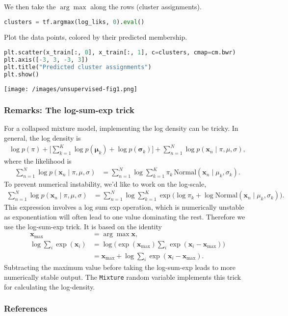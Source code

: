 We then take the $\arg\max$ along the rows (cluster assignments).
\begin{lstlisting}[language=Python]
clusters = tf.argmax(log_liks, 0).eval()
\end{lstlisting}

Plot the data points, colored by their predicted membership.
\begin{lstlisting}[language=Python]
plt.scatter(x_train[:, 0], x_train[:, 1], c=clusters, cmap=cm.bwr)
plt.axis([-3, 3, -3, 3])
plt.title("Predicted cluster assignments")
plt.show()
\end{lstlisting}

\texttt{[image: /images/unsupervised-fig1.png]}

\subsubsection{Remarks: The log-sum-exp trick}

For a collapsed mixture model, implementing the log density can be tricky.
In general, the log density is
\begin{align*}
  \log p(\pi) +
  \Big[ \sum_{k=1}^K \log p(\mathbf{\mu}_k) + \log
  p(\mathbf{\sigma}_k) \Big] +
  \sum_{n=1}^N \log p(\mathbf{x}_n \mid \pi, \mu, \sigma),
\end{align*}
where the likelihood is
\begin{align*}
  \sum_{n=1}^N \log p(\mathbf{x}_n \mid \pi, \mu, \sigma)
  &=
  \sum_{n=1}^N \log \sum_{k=1}^K \pi_k \, \text{Normal}(\mathbf{x}_n \mid
  \mu_k, \sigma_k).
\end{align*}
To prevent numerical instability, we'd like to work on the log-scale,
\begin{align*}
  \sum_{n=1}^N \log p(\mathbf{x}_n \mid \pi, \mu, \sigma)
  &=
  \sum_{n=1}^N \log \sum_{k=1}^K \exp\Big(
  \log \pi_k + \log \text{Normal}(\mathbf{x}_n \mid \mu_k, \sigma_k)\Big).
\end{align*}
This expression involves a log sum exp operation, which is
numerically unstable as exponentiation will often lead to one value
dominating the rest. Therefore we use the log-sum-exp trick.
It is based on the identity
\begin{align*}
  \mathbf{x}_{\mathrm{max}}
  &=
  \arg\max \mathbf{x},
  \\
  \log \sum_i \exp(\mathbf{x}_i)
  &=
  \log \Big(\exp(\mathbf{x}_{\mathrm{max}}) \sum_i \exp(\mathbf{x}_i -
  \mathbf{x}_{\mathrm{max}})\Big)
  \\
  &=
  \mathbf{x}_{\mathrm{max}} + \log \sum_i \exp(\mathbf{x}_i -
  \mathbf{x}_{\mathrm{max}}).
\end{align*}
Subtracting the maximum value before taking the log-sum-exp leads to
more numerically stable output. The \texttt{Mixture} random variable
implements this trick for calculating the log-density.

\subsubsection{References}\label{references}
